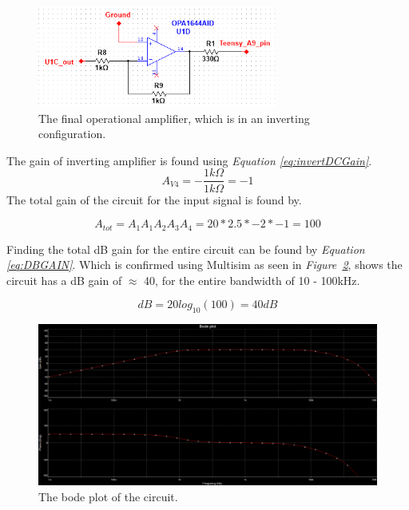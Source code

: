 \begin{figure}[h]
    \centering
    \includegraphics[width=0.70\textwidth]{graphics/OPamp4.png}
    \caption{The final operational amplifier, which is in an inverting configuration.}
    \label{fig:Opamp4}
\end{figure}

The gain of inverting amplifier is found using \textit{Equation \ref{eq:invertDCGain}}.
$$ A_{V4} = -\frac{1k \Omega}{1k \Omega} = -1$$
The total gain of the circuit for the input signal is found by.

$$A_{tot} = A_1A_1A_2A_3A_4 = 20*2.5*-2*-1 = 100$$

Finding the total dB gain for the entire circuit can be found by \textit{Equation \ref{eq:DBGAIN}}. 
Which is confirmed using Multisim as seen in \textit{Figure~\ref{fig:bode}},
shows the circuit has a dB gain of $\approx$ 40, for the entire bandwidth of 10 - 100kHz.

$$dB = 20log_{10}(100) = 40dB$$

\begin{figure}[h]
    \centering
    \includegraphics[width=1.0\textwidth]{graphics/bodeNew.png}
    \caption{The bode plot of the circuit.}
    \label{fig:bode}
\end{figure}


